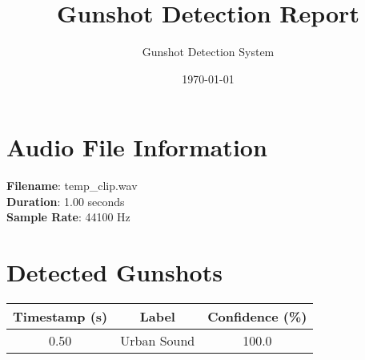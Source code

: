 \documentclass{article}
\title{Gunshot Detection Report}
\author{Gunshot Detection System}
\date{\today}
\begin{document}
\maketitle

\section*{Audio File Information}
\textbf{Filename}: temp_clip.wav\\
\textbf{Duration}: 1.00 seconds\\
\textbf{Sample Rate}: 44100 Hz

\section*{Detected Gunshots}
\begin{tabular}{|c|c|c|}
\hline
Timestamp (s) & Label & Confidence (\%)\\
\hline
0.50 & Urban Sound & 100.0\\
\hline
\end{tabular}
\end{document}
